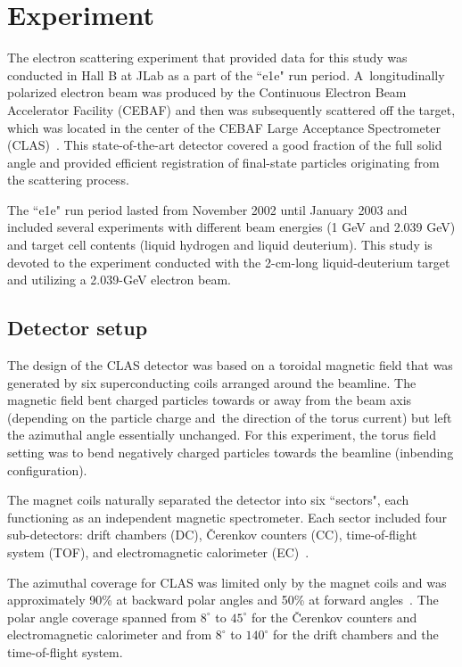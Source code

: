 \documentclass[prc,twocolumn,superscriptaddress,showpacs,amssymb,amsmath,amsfonts,aps,nofootinbib]{revtex4-1}
\begin{document}
\section{Experiment}
\label{Chapt:experiment}

The electron scattering experiment that provided data for this study was conducted in Hall B at JLab as a part of the ``e1e" run period. A~longitudinally polarized electron beam was produced by the Continuous Electron Beam Accelerator Facility (CEBAF) and then was subsequently scattered off the target, which was located in the center of the CEBAF Large Acceptance Spectrometer (CLAS)~\cite{Mecking:2003zu}. This state-of-the-art detector covered a good fraction of the full solid angle and provided efficient registration of final-state particles originating from the scattering process.

The ``e1e" run period lasted from November 2002 until January 2003 and included several experiments with different beam energies (1 GeV and 2.039 GeV) and target cell contents (liquid hydrogen and liquid deuterium). This study is devoted to the experiment conducted with the 2-cm-long liquid-deuterium target and utilizing a 2.039-GeV electron beam. 

\subsection{Detector setup}

The design of the CLAS detector was based on a toroidal magnetic field that was generated by six superconducting coils arranged around the beamline. The magnetic field bent charged particles towards or away from the beam axis (depending on the particle charge and~the direction of the torus current) but left the azimuthal angle essentially unchanged. For this experiment, the torus field setting was to bend negatively charged particles towards the beamline (inbending configuration).

The magnet coils naturally separated the detector into six ``sectors", each functioning as an independent magnetic spectrometer. Each sector included four sub-detectors: drift chambers (DC), \v Cerenkov counters (CC), time-of-flight system (TOF), and electromagnetic calorimeter (EC)~\cite{Mecking:2003zu}.


The azimuthal coverage for CLAS was limited only by the magnet coils and was approximately 90\% at backward polar angles and 50\% at forward angles~\cite{Amarian:2001zs}. The polar angle coverage spanned from $8^{\circ}\mathrm{}$ to $45^{\circ}\mathrm{}$ for the \v Cerenkov counters and electromagnetic calorimeter and from $8^{\circ}\mathrm{}$ to $140^{\circ}\mathrm{}$ for the drift chambers and the time-of-flight system.
\end{document}
